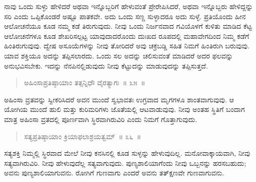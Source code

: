 \vspace{-0.4cm}


ನಾವು ಒಂದು ಸುಳ್ಳು ಹೇಳಿದರೆ ಅಥವಾ ಇನ್ನೊಬ್ಬರಿಗೆ ಹೇಳುವಂತೆ ಪ್ರೇರೇಪಿಸಿದರೆ, ಅಥವಾ ಇನ್ನೊಬ್ಬರು ಹೇಳಿದ್ದನ್ನು ಸರಿ ಎಂದು ಒಪ್ಪಿಕೊಂಡರೆ ಅಷ್ಟೂ ಪಾತಕವೇ. ಅದು ಒಂದು ಸಣ್ಣ ಸುಳ್ಳಾದರೂ ಅದು ಸುಳ್ಳೆ. ಪ್ರತಿಯೊಂದು ಹೀನ ಆಲೋಚನೆಯೂ ಕೂಡ ನಮ್ಮ ಕಡೆ ತಿರುಗುವುದು. ನೀವು ಒಂದು ನಿರ್ಜನವಾದ ಗವಿಯೊಳಗೆ ಕುಳಿತು ಮಾಡಿದ ಕೆಟ್ಟ ಆಲೋಚನೆಗಳೂ ಕೂಡ ಶೇಖರಿಸಲ್ಪಟ್ಟ ಯಾವುದಾದರೊಂದು ದುಃಖದ ರೂಪದಲ್ಲಿ ಮಹಾವೇಗದಿಂದ ನಿಮ್ಮ ಕಡೆಗೆ ಹಿಂತಿರುಗುವುವು. ದ್ವೇಷ ಅಸೂಯೆಗಳನ್ನು ನೀವು ತೋರಿದರೆ ಅವು ಚಕ್ರಬಡ್ಡಿ ಸಹಿತ ನಿಮಗೆ ಹಿಂತಿರುಗಿ ಬರುವುವು. ಯಾವ ಶಕ್ತಿಯೂ ಅದನ್ನು ತಪ್ಪಿಸಲಾರದು. ಒಂದು ಸಲ ಅದನ್ನು ಚಲಿಸುವಂತೆ ಮಾಡಿದರೆ ಅದರ ಫಲವನ್ನು ಅನುಭವಿಸಬೇಕು. ಇದನ್ನು ನೆನಪಿನಲ್ಲಿಡುವುದು ನೀವು ಕೆಟ್ಟುದನ್ನು ಮಾಡುವುದನ್ನು ತಪ್ಪಿಸುತ್ತದೆ. 

\vspace{-0.3cm}

\begin{verse}
ಅಹಿಂಸಾಪ್ರತಿಷ್ಠಾಯಾಂ ತತ್ಸನ್ನಿಧೌ ವೈರತ್ಯಾಗಃ~॥ ೩೫~॥
\end{verse}

\vspace{-0.3cm}


ಅಹಿಂಸಾ ವ್ರತವನ್ನು ಸ್ವೀಕರಿಸಿದರೆ ಅವನ ಮುಂದೆ ಸ್ವಭಾವತಃ ಉಗ್ರವಾದ ಮೃಗಗಳೂ ಶಾಂತವಾಗುವುವು. ಆ ಯೋಗಿಯ ಮುಂದೆ ಹುಲಿ ಮತ್ತು ಕುರಿಮರಿಗಳು ಜೊತೆಯಲ್ಲಿ ಆಟವಾಡುವುವು. ನೀವು ಅಂತಹ ಸ್ಥಿತಿಗೆ ಬಂದಾಗ ಮಾತ್ರ ಅಹಿಂಸಾ ವ್ರತದಲ್ಲಿ ಪೂರ್ಣವಾಗಿ ಸ್ಥಿರವಾಗಿರುವಿರಿ ಎಂದು ನಿಮಗೆ ಗೊತ್ತಾಗುವುದು. 

\vspace{-0.4cm}

\begin{verse}
ಸತ್ಯಪ್ರತಿಷ್ಠಾಯಾಂ ಕ್ರಿಯಾಫಲಾಶ್ರಯತ್ವಮ್​~॥ ೩೬~॥
\end{verse}

\vspace{-0.35cm}


ಸತ್ಯಶಕ್ತಿ ನಿಮ್ಮಲ್ಲಿ ಸ್ಥಿರವಾದ ಮೇಲೆ ನೀವು ಕನಸಿನಲ್ಲಿ ಕೂಡ ಸುಳ್ಳನ್ನು ಹೇಳುವುದಿಲ್ಲ. ಮನೋವಾಕ್ಕಾಯವಾಗಿ, ನೀವು ಸತ್ಯವಾಗಿರುವಿರಿ. ನೀವು ಹೇಳುವುದೆಲ್ಲ ಸತ್ಯವಾಗುವುದು. ಪುಣ್ಯಶಾಲಿಯಾಗೆಂದು ನೀವು ಒಬ್ಬನನ್ನು ಹರಸಬಹುದು; ಅವನು ಪುಣ್ಯಶಾಲಿಯಾಗುವನು. ರೋಗಿಗೆ ಗುಣವಾಗು ಎಂದರೆ ಅವನು ತತ್​ಕ್ಷಣವೇ ಗುಣವಾಗುವನು. 

